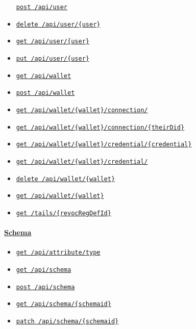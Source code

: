 \begin{itemize}
  \protect\hyperlink{apiUserPost}{\texttt{post\ /api/user}}
\item
  \protect\hyperlink{apiUserUserDelete}{\texttt{delete\ /api/user/\{user\}}}
\item
  \protect\hyperlink{apiUserUserGet}{\texttt{get\ /api/user/\{user\}}}
\item
  \protect\hyperlink{apiUserUserPut}{\texttt{put\ /api/user/\{user\}}}
\item
  \protect\hyperlink{apiWalletGet}{\texttt{get\ /api/wallet}}
\item
  \protect\hyperlink{apiWalletPost}{\texttt{post\ /api/wallet}}
\item
  \protect\hyperlink{apiWalletWalletConnectionGet}{\texttt{get\ /api/wallet/\{wallet\}/connection/}}
\item
  \protect\hyperlink{apiWalletWalletConnectionTheirDidGet}{\texttt{get\ /api/wallet/\{wallet\}/connection/\{theirDid\}}}
\item
  \protect\hyperlink{apiWalletWalletCredentialCredentialGet}{\texttt{get\ /api/wallet/\{wallet\}/credential/\{credential\}}}
\item
  \protect\hyperlink{apiWalletWalletCredentialGet}{\texttt{get\ /api/wallet/\{wallet\}/credential/}}
\item
  \protect\hyperlink{apiWalletWalletDelete}{\texttt{delete\ /api/wallet/\{wallet\}}}
\item
  \protect\hyperlink{apiWalletWalletGet}{\texttt{get\ /api/wallet/\{wallet\}}}
\item
  \protect\hyperlink{tailsRevocRegDefIdGet}{\texttt{get\ /tails/\{revocRegDefId\}}}
\end{itemize}

\hypertarget{schema}{%
\paragraph{\texorpdfstring{\protect\hyperlink{Schema}{Schema}}{Schema}}\label{schema}}

\begin{itemize}
\tightlist
\item
  \protect\hyperlink{apiAttributeTypeGet}{\texttt{get\ /api/attribute/type}}
\item
  \protect\hyperlink{apiSchemaGet}{\texttt{get\ /api/schema}}
\item
  \protect\hyperlink{apiSchemaPost}{\texttt{post\ /api/schema}}
\item
  \protect\hyperlink{apiSchemaSchemaidGet}{\texttt{get\ /api/schema/\{schemaid\}}}
\item
  \protect\hyperlink{apiSchemaSchemaidPatch}{\texttt{patch\ /api/schema/\{schemaid\}}}
\end{itemize}

